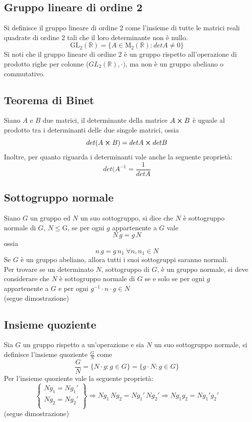 \begin{flushleft}
\subsection{Gruppo lineare di ordine 2}
Si definisce il gruppo lineare di ordine 2 come l'insieme di tutte le matrici reali quadrate di ordine 2 tali che il loro determinante non è nullo.\\
\[\text{GL}_2(\mathbb{R})=\{A \in \text{M}_2(\mathbb{R}):detA \neq 0\}\]
Si noti che il gruppo lineare di ordine 2 è un gruppo rispetto all'operazione di prodotto righe per colonne ($GL_2(\mathbb{R}), \cdot)$, ma non è un gruppo abeliano o commutativo.

\subsection{Teorema di Binet}
Siano $A$ e $B$ due matrici, il determinante della matrice $A\cross B$ è uguale al prodotto tra i determinanti delle due singole matrici, ossia
\[det(A\cross B) = detA \cross detB\]
Inoltre, per quanto riguarda i determinanti vale anche la seguente proprietà:
\[det(A^{-1} = \frac{1}{detA}\]

\subsection{Sottogruppo normale}
Siano $G$ un gruppo ed $N$ un suo sottogruppo, si dice che $N$ è sottogruppo normale di $G$, $N\leqslant$G, se per ogni $g$ appartenente a $G$ vale
\[N\,g = g\,N\]
ossia
\[n\,g = g\,n_1\;\forall n,n_1 \in N\]
Se $G$ è un gruppo abeliano, allora tutti i suoi sottogruppi saranno normali.\\
Per trovare se un determinato $N$, sottogruppo di $G$, è un gruppo normale, si deve considerare che $N$ è sottogruppo normale di $G$ se e solo se per ogni $g$ appartenente a $G$ e per ogni $g^{-1}\cdot n\cdot g \in N$\\
(segue dimostrazione)
\\ \vspace{300px}



\subsection{Insieme quoziente}
Sia $G$ un gruppo rispetto a un'operazione e sia $N$ un suo sottogruppo normale, si definisce l'insieme quoziente $\frac{G}{N}$ come
\[\frac{G}{N} = \{N\cdot g: g\in G\} = \{g\cdot N:g\in G\}\]
Per l'insieme quoziente vale la seguente proprietà:
\[
\left.
  \begin{cases}
    Ng_1 = Ng_1' \\
    Ng_2 = Ng_2' \\
  \end{cases}
  \right\} \Rightarrow Ng_1\,Ng_2 = Ng_1'\,Ng_2' \Rightarrow Ng_1g_2 = Ng_1'g_2'
\]
(segue dimostrazione)
\\ \vspace{300px}


\end{flushleft}
